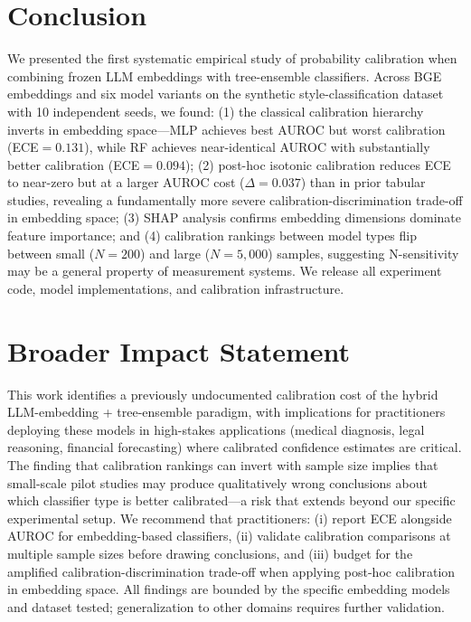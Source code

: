 \documentclass[11pt]{article}
\begin{document}
\section{Conclusion}

We presented the first systematic empirical study of probability calibration when combining frozen LLM embeddings with tree-ensemble classifiers. Across BGE embeddings and six model variants on the synthetic style-classification dataset with 10 independent seeds, we found: (1) the classical calibration hierarchy inverts in embedding space---MLP achieves best AUROC but worst calibration (ECE${=}0.131$), while RF achieves near-identical AUROC with substantially better calibration (ECE${=}0.094$); (2) post-hoc isotonic calibration reduces ECE to near-zero but at a larger AUROC cost ($\Delta{=}0.037$) than in prior tabular studies, revealing a fundamentally more severe calibration-discrimination trade-off in embedding space; (3) SHAP analysis confirms embedding dimensions dominate feature importance; and (4) calibration rankings between model types flip between small ($N{=}200$) and large ($N{=}5{,}000$) samples, suggesting N-sensitivity may be a general property of measurement systems. We release all experiment code, model implementations, and calibration infrastructure.

\section*{Broader Impact Statement}

This work identifies a previously undocumented calibration cost of the hybrid LLM-embedding + tree-ensemble paradigm, with implications for practitioners deploying these models in high-stakes applications (medical diagnosis, legal reasoning, financial forecasting) where calibrated confidence estimates are critical. The finding that calibration rankings can invert with sample size implies that small-scale pilot studies may produce qualitatively wrong conclusions about which classifier type is better calibrated---a risk that extends beyond our specific experimental setup. We recommend that practitioners: (i) report ECE alongside AUROC for embedding-based classifiers, (ii) validate calibration comparisons at multiple sample sizes before drawing conclusions, and (iii) budget for the amplified calibration-discrimination trade-off when applying post-hoc calibration in embedding space. All findings are bounded by the specific embedding models and dataset tested; generalization to other domains requires further validation.
\end{document}
